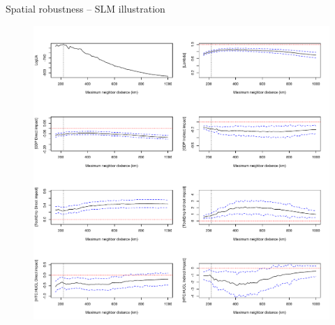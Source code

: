 \documentclass{beamer}
\begin{document}
\begin{frame}{Spatial robustness -- SLM illustration}
\vspace{-0.3cm}
\begin{figure}
	\includegraphics[width=.65\textwidth]{IMG/sp_Stability.pdf}
\end{figure}
\end{frame}
\end{document}

